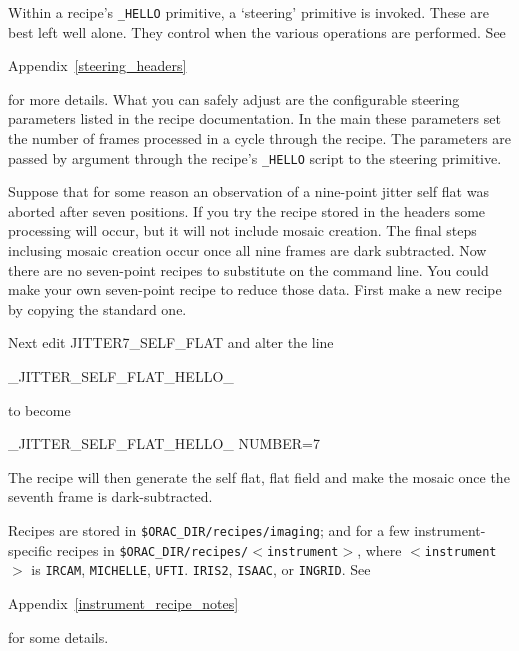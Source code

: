 \documentclass[twoside,11pt,nolof]{starlink}
\begin{document}
Within a recipe's {\tt\_HELLO} primitive, a `steering' primitive is invoked.
These are best left well alone.  They control when the various
operations are performed.  See


\begin{latexonly}
Appendix~\ref{steering_headers}
\end{latexonly}
for more details.  What you can safely adjust are the
configurable steering parameters listed in the recipe documentation.
In the main these parameters set the number of frames processed in a
cycle through the recipe.  The parameters are passed by argument
through the recipe's {\tt\_HELLO} script to the steering primitive.

Suppose that for some reason an observation of a nine-point jitter
self flat was aborted after seven positions.  If you try the recipe
stored in the headers some processing will occur, but it will not
include mosaic creation.  The final steps inclusing mosaic creation
occur once all nine frames are dark subtracted.  Now there are no
seven-point recipes to substitute on the command line.  You could make
your own seven-point recipe to reduce those data.  First make a new
recipe by copying the standard one.

\begin{terminalv}
\end{terminalv}
Next edit JITTER7\_SELF\_FLAT and alter the line

\begin{terminalv}
      _JITTER_SELF_FLAT_HELLO_
\end{terminalv}
to become

\begin{terminalv}
      _JITTER_SELF_FLAT_HELLO_ NUMBER=7
\end{terminalv}
The recipe will then generate the self flat, flat field and make the
mosaic once the seventh frame is dark-subtracted.

Recipes are stored in {\tt\$ORAC\_DIR/recipes/imaging}; and for a few
instrument-specific recipes in {\tt\$ORAC\_DIR/recipes/$<$instrument$>$},
where {\tt$<$instrument$>$} is \texttt{IRCAM}, \texttt{MICHELLE}, \texttt{UFTI}. \texttt{IRIS2}, \texttt{ISAAC}, or \texttt{INGRID}.  See


\begin{latexonly}
Appendix~\ref{instrument_recipe_notes}
\end{latexonly}
for some details.
\end{document}
